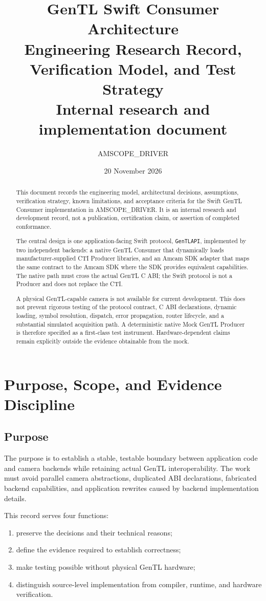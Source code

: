 \documentclass[11pt,a4paper]{report}
\title{\textbf{GenTL Swift Consumer Architecture}\\
\large Engineering Research Record, Verification Model, and Test Strategy\\[1em]
\normalsize Internal research and implementation document}
\author{AMSCOPE\_DRIVER}
\date{20 November 2026}
\begin{document}
\maketitle

\begin{abstract}
This document records the engineering model, architectural decisions, assumptions, verification strategy, known limitations, and acceptance criteria for the Swift GenTL Consumer implementation in AMSCOPE\_DRIVER. It is an internal research and development record, not a publication, certification claim, or assertion of completed conformance.

The central design is one application-facing Swift protocol, \texttt{GenTLAPI}, implemented by two independent backends: a native GenTL Consumer that dynamically loads manufacturer-supplied CTI Producer libraries, and an Amcam SDK adapter that maps the same contract to the Amcam SDK where the SDK provides equivalent capabilities. The native path must cross the actual GenTL C ABI; the Swift protocol is not a Producer and does not replace the CTI.

A physical GenTL-capable camera is not available for current development. This does not prevent rigorous testing of the protocol contract, C ABI declarations, dynamic loading, symbol resolution, dispatch, error propagation, router lifecycle, and a substantial simulated acquisition path. A deterministic native Mock GenTL Producer is therefore specified as a first-class test instrument. Hardware-dependent claims remain explicitly outside the evidence obtainable from the mock.
\end{abstract}

\tableofcontents

\chapter{Purpose, Scope, and Evidence Discipline}

\section{Purpose}
The purpose is to establish a stable, testable boundary between application code and camera backends while retaining actual GenTL interoperability. The work must avoid parallel camera abstractions, duplicated ABI declarations, fabricated backend capabilities, and application rewrites caused by backend implementation details.

This record serves four functions:
\begin{enumerate}
  \item preserve the decisions and their technical reasons;
  \item define the evidence required to establish correctness;
  \item make testing possible without physical GenTL hardware;
  \item distinguish source-level implementation from compiler, runtime, and hardware verification.
\end{enumerate}
\end{document}
